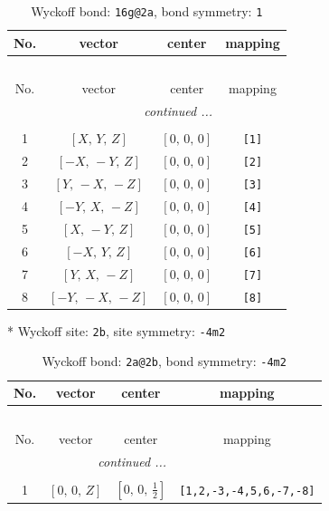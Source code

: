 \documentclass[fleqn,8pt]{jsarticle}
\begin{document}
\renewcommand{\arraystretch}{1.2}
\begin{longtable}{cccc}
\caption{Wyckoff bond: {\tt 16g@2a}, bond symmetry: {\tt 1}}
 \\
 \hline \hline
No. & vector & center & mapping \\ \hline \endfirsthead

\multicolumn{3}{l}{\tablename\ \thetable{}} \\
 \hline \hline
No. & vector & center & mapping \\ \hline \endhead

 \hline \hline
\multicolumn{3}{r}{\footnotesize\it continued ...} \\ \endfoot

 \hline \hline
\multicolumn{3}{r}{} \\ \endlastfoot

1 & $\left[ X,\, Y,\, Z \right]$ & $\left[ 0,\, 0,\, 0 \right]$ & {\tt [1]} \\ \hline
2 & $\left[ - X,\, - Y,\, Z \right]$ & $\left[ 0,\, 0,\, 0 \right]$ & {\tt [2]} \\ \hline
3 & $\left[ Y,\, - X,\, - Z \right]$ & $\left[ 0,\, 0,\, 0 \right]$ & {\tt [3]} \\ \hline
4 & $\left[ - Y,\, X,\, - Z \right]$ & $\left[ 0,\, 0,\, 0 \right]$ & {\tt [4]} \\ \hline
5 & $\left[ X,\, - Y,\, Z \right]$ & $\left[ 0,\, 0,\, 0 \right]$ & {\tt [5]} \\ \hline
6 & $\left[ - X,\, Y,\, Z \right]$ & $\left[ 0,\, 0,\, 0 \right]$ & {\tt [6]} \\ \hline
7 & $\left[ Y,\, X,\, - Z \right]$ & $\left[ 0,\, 0,\, 0 \right]$ & {\tt [7]} \\ \hline
8 & $\left[ - Y,\, - X,\, - Z \right]$ & $\left[ 0,\, 0,\, 0 \right]$ & {\tt [8]} \\
\end{longtable}
* Wyckoff site: {\tt 2b}, site symmetry: {\tt -4m2}
\renewcommand{\arraystretch}{1.2}
\begin{longtable}{cccc}
\caption{Wyckoff bond: {\tt 2a@2b}, bond symmetry: {\tt -4m2}}
 \\
 \hline \hline
No. & vector & center & mapping \\ \hline \endfirsthead

\multicolumn{3}{l}{\tablename\ \thetable{}} \\
 \hline \hline
No. & vector & center & mapping \\ \hline \endhead

 \hline \hline
\multicolumn{3}{r}{\footnotesize\it continued ...} \\ \endfoot

 \hline \hline
\multicolumn{3}{r}{} \\ \endlastfoot

1 & $\left[ 0,\, 0,\, Z \right]$ & $\left[ 0,\, 0,\, \frac{1}{2} \right]$ & {\tt [1,2,-3,-4,5,6,-7,-8]} \\
\end{longtable}
\end{document}
